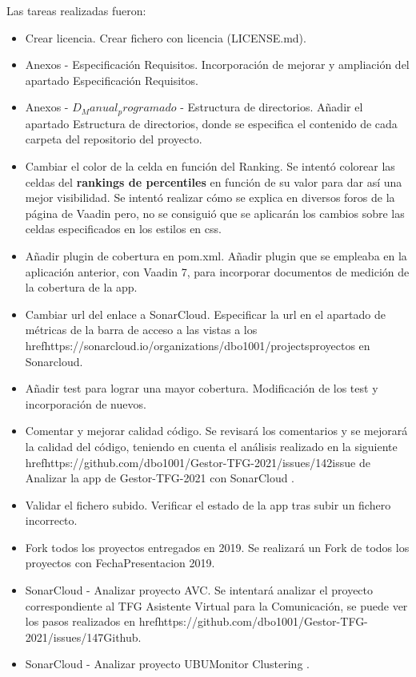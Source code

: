 Las tareas realizadas fueron:
\begin{itemize}
	\tightlist
	\item Crear licencia.
		Crear fichero con licencia (LICENSE.md).
	\item Anexos - Especificación Requisitos.
		Incorporación de mejorar y ampliación del apartado Especificación Requisitos.
	\item Anexos - $D_Manual_programado$ - Estructura de directorios.
		Añadir el apartado Estructura de directorios, donde se especifica el contenido de cada carpeta del repositorio del proyecto.
	\item Cambiar el color de la celda en función del Ranking.
		Se intentó colorear las celdas del \textbf{rankings de percentiles} en función de su valor para dar así una mejor visibilidad. Se intentó realizar cómo se explica en diversos foros de la página de Vaadin pero, no se consiguió que se aplicarán los cambios sobre las celdas especificados en los estilos en css.
	\item Añadir plugin de cobertura en pom.xml.
		Añadir plugin que se empleaba en la aplicación anterior, con Vaadin 7, para incorporar documentos de medición de la cobertura de la app.
	\item Cambiar url del enlace a SonarCloud.
		Especificar la url en el apartado de métricas de la barra de acceso a las vistas a los href{https://sonarcloud.io/organizations/dbo1001/projects}{proyectos en Sonarcloud}.
	\item Añadir test para lograr una mayor cobertura.
		Modificación de los test y incorporación de nuevos.
	\item Comentar y mejorar calidad código.
		Se revisará los comentarios y se mejorará la calidad del código, teniendo en cuenta el análisis realizado en la siguiente href{https://github.com/dbo1001/Gestor-TFG-2021/issues/142}{issue de Analizar la app de Gestor-TFG-2021 con SonarCloud} . 
	\item Validar el fichero subido.
		Verificar el estado de la app tras subir un fichero incorrecto.
	\item Fork todos los proyectos entregados en 2019.
		Se realizará un Fork de todos los proyectos con FechaPresentacion 2019.
	\item SonarCloud - Analizar proyecto AVC.
		Se intentará analizar el proyecto correspondiente al TFG Asistente Virtual para la Comunicación, se puede ver los pasos realizados en href{https://github.com/dbo1001/Gestor-TFG-2021/issues/147}{Github}.
	\item SonarCloud - Analizar proyecto UBUMonitor Clustering .

\end{itemize}
